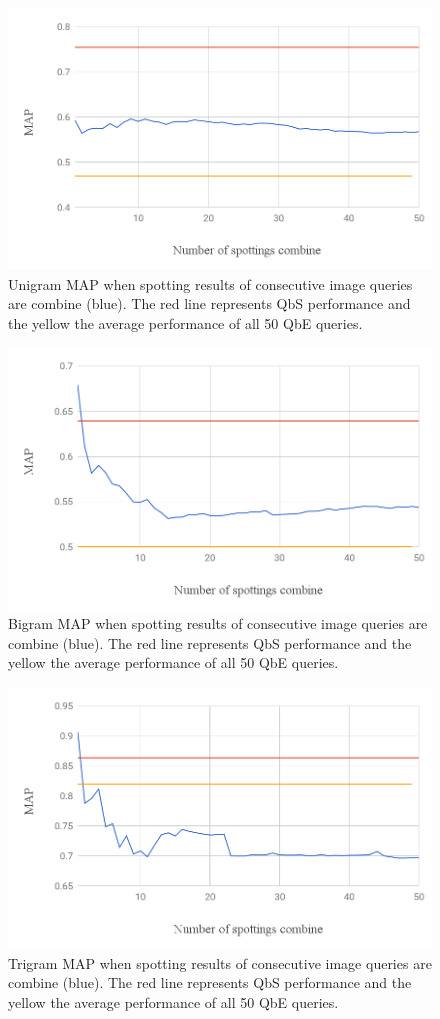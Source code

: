 \documentclass[ms,electronic,twosidetoc,letterpaper,chaptercenter,parttop,lol,lof,lot]{byumsphd}
\begin{document}
\begin{figure}
    \centering
    \includegraphics[width=.75\textwidth]{unigram_respot_chart}
    \caption{Unigram MAP when spotting results of consecutive image queries are combine (blue). The red line represents QbS performance and the yellow the average performance of all 50 QbE queries.}
    \label{fig:unigram_respot}
\end{figure}
\begin{figure}
    \centering
    \includegraphics[width=.75\textwidth]{bigram_respot_chart}
    \caption{Bigram MAP when spotting results of consecutive image queries are combine (blue). The red line represents QbS performance and the yellow the average performance of all 50 QbE queries.}
    \label{fig:bigram_respot}
\end{figure}
\begin{figure}
    \centering
    \includegraphics[width=.75\textwidth]{trigram_respot_chart}
    \caption{Trigram MAP when spotting results of consecutive image queries are combine (blue). The red line represents QbS performance and the yellow the average performance of all 50 QbE queries.}
    \label{fig:trigram_respot}
\end{figure}
\end{document}
